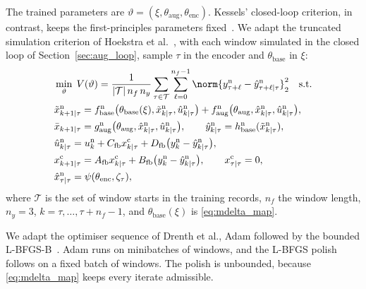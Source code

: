The trained parameters are $\vartheta=(\xi,\theta_{\mathrm{aug}},\theta_{\mathrm{enc}})$.
Kessels' closed-loop criterion, in contrast, keeps the first-principles
parameters fixed~\cite[Eq.~(5.12)]{kessels2025ai}.
We adapt the truncated simulation criterion of Hoekstra et
al.~\cite[Eq.~(22)]{hoekstra2026lfr}, with each window simulated in the closed
loop of Section~\ref{sec:aug_loop}, sample $\tau$ in the encoder and
$\theta_{\mathrm{base}}$ in $\xi$:
{\small
\begin{equation}
\begin{aligned}
 &\min_{\vartheta}\;V(\vartheta)=\frac{1}{|\mathcal T|\,n_f\,n_y}
  \sum_{\tau\in\mathcal T}\sum_{\ell=0}^{n_f-1}
  \norm{y^{\mathrm n}_{\tau+\ell}-\hat y^{\mathrm n}_{\tau+\ell|\tau}}_2^2
  \quad\text{s.t.}\\
 &\tilde x^{\mathrm n}_{k+1|\tau}
  =f^{\mathrm n}_{\mathrm{base}}\bigl(\theta_{\mathrm{base}}(\xi),
   \tilde x^{\mathrm n}_{k|\tau},\hat u^{\mathrm n}_{k|\tau}\bigr)
  +f^{\mathrm n}_{\mathrm{aug}}\bigl(\theta_{\mathrm{aug}},
   \hat x^{\mathrm n}_{k|\tau},\hat u^{\mathrm n}_{k|\tau}\bigr),\\
 &\bar x_{k+1|\tau}
  =g^{\mathrm n}_{\mathrm{aug}}\bigl(\theta_{\mathrm{aug}},
   \hat x^{\mathrm n}_{k|\tau},\hat u^{\mathrm n}_{k|\tau}\bigr),\qquad
  \hat y^{\mathrm n}_{k|\tau}=h^{\mathrm n}_{\mathrm{base}}(\tilde x^{\mathrm n}_{k|\tau}),\\
 &\hat u^{\mathrm n}_{k|\tau}=u^{\mathrm n}_k+C_{\mathrm{fb}}x^{\mathrm c}_{k|\tau}
  +D_{\mathrm{fb}}\bigl(y^{\mathrm n}_k-\hat y^{\mathrm n}_{k|\tau}\bigr),\\
 &x^{\mathrm c}_{k+1|\tau}=A_{\mathrm{fb}}x^{\mathrm c}_{k|\tau}
  +B_{\mathrm{fb}}\bigl(y^{\mathrm n}_k-\hat y^{\mathrm n}_{k|\tau}\bigr),\qquad
  x^{\mathrm c}_{\tau|\tau}=0,\\
 &\hat x^{\mathrm n}_{\tau|\tau}=\psi(\theta_{\mathrm{enc}},\zeta_\tau),
\end{aligned}
\label{eq:aug_loss}
\end{equation}
}
where $\mathcal T$ is the set of window starts in the training records, $n_f$
the window length, $n_y=3$, $k=\tau,\dots,\tau+n_f-1$, and
$\theta_{\mathrm{base}}(\xi)$ is \eqref{eq:mdelta_map}.

We adapt the optimiser sequence of Drenth et al., Adam followed by the bounded
L-BFGS-B~\cite[Sec.~5]{drenth2025lpvlfr}.
Adam runs on minibatches of windows, and the L-BFGS polish follows on a fixed
batch of windows.
The polish is unbounded, because \eqref{eq:mdelta_map} keeps every iterate
admissible.

